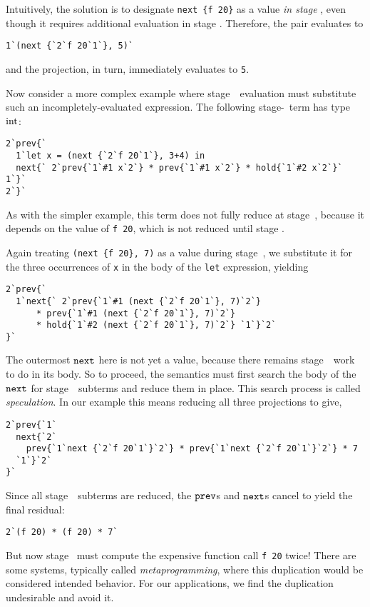 Intuitively, the solution is to designate \verb|next {f 20}| as a value
\emph{in stage \bbone}, even though it requires additional evaluation in stage
\bbtwo. Therefore, the pair evaluates to
\begin{lstlisting}
1`(next {`2`f 20`1`}, 5)`
\end{lstlisting}
and the projection, in turn, immediately evaluates to \verb|5|.

Now consider a more complex example where stage~\bbone\ evaluation must
substitute such an incompletely-evaluated expression. The following
stage-\bbtwo\ term has type ${\rm int}$:
\begin{lstlisting} 
2`prev{`
  1`let x = (next {`2`f 20`1`}, 3+4) in
  next{` 2`prev{`1`#1 x`2`} * prev{`1`#1 x`2`} * hold{`1`#2 x`2`}` 1`}`
2`}`
\end{lstlisting}
As with the simpler example, this term does not fully reduce at stage~\bbone, 
because it depends on the value of \verb|f 20|, which is not reduced until stage \bbtwo.

Again treating \verb|(next {f 20}, 7)| as a value during stage~\bbone, we
substitute it for the three occurrences of \verb|x| in the body of the
\verb|let| expression, yielding
\begin{lstlisting} 
2`prev{`
  1`next{` 2`prev{`1`#1 (next {`2`f 20`1`}, 7)`2`} 
      * prev{`1`#1 (next {`2`f 20`1`}, 7)`2`} 
      * hold{`1`#2 (next {`2`f 20`1`}, 7)`2`} `1`}`2`
}`
\end{lstlisting}
The outermost ${\tt next}$ here is not yet a value, because there remains stage~\bbone\ work to do in its body.
So to proceed, the semantics must first search the body of the ${\tt next}$ for stage~\bbone\ subterms and reduce them in place.
This search process is called {\em speculation}.
In our example this means reducing all three projections to give,
\begin{lstlisting} 
2`prev{`1`
  next{`2` 
    prev{`1`next {`2`f 20`1`}`2`} * prev{`1`next {`2`f 20`1`}`2`} * 7 
  `1`}`2`
}`
\end{lstlisting}
Since all stage~\bbone\ subterms are reduced, the ${\tt prev}$s and ${\tt next}$s cancel to yield the final residual:
\begin{lstlisting} 
2`(f 20) * (f 20) * 7`
\end{lstlisting}
But now stage \bbtwo\ must compute the expensive function call \verb|f 20| twice! 
There are some systems, typically called {\em metaprogramming}, 
where this duplication would be considered intended behavior.
For our applications, we find the duplication undesirable and avoid it.

